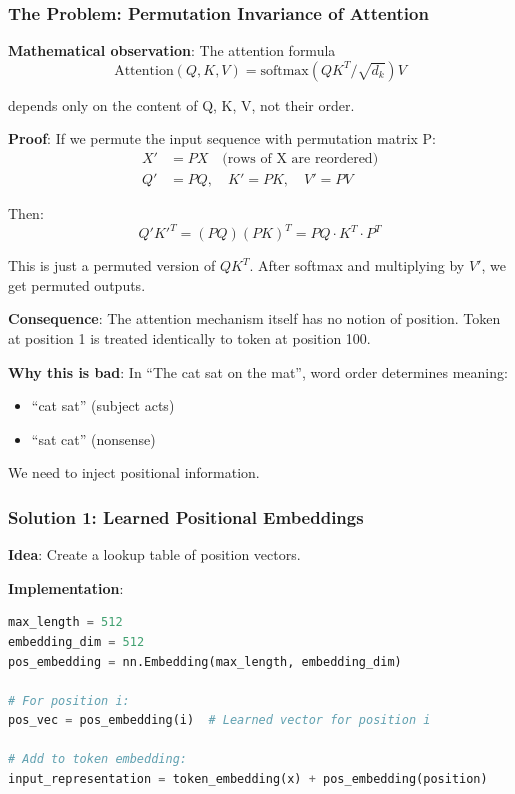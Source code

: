 \subsubsection{The Problem: Permutation Invariance of Attention}

\textbf{Mathematical observation}: The attention formula
\[
\text{Attention}(Q, K, V) = \text{softmax}(QK^T/\sqrt{d_k}) V
\]

depends only on the content of Q, K, V, not their order.

\textbf{Proof}: If we permute the input sequence with permutation matrix P:
\begin{align*}
X' &= PX  \quad \text{(rows of X are reordered)} \\
Q' &= PQ, \quad K' = PK, \quad V' = PV
\end{align*}

Then:
\[
Q'K'^T = (PQ)(PK)^T = PQ \cdot K^T \cdot P^T
\]

This is just a permuted version of $QK^T$. After softmax and multiplying by $V'$, we get permuted outputs.

\textbf{Consequence}: The attention mechanism itself has no notion of position. Token at position 1 is treated identically to token at position 100.

\textbf{Why this is bad}: In ``The cat sat on the mat'', word order determines meaning:
\begin{itemize}
\item ``cat sat'' (subject acts)
\item ``sat cat'' (nonsense)
\end{itemize}

We need to inject positional information.

\subsubsection{Solution 1: Learned Positional Embeddings}

\textbf{Idea}: Create a lookup table of position vectors.

\textbf{Implementation}:
\begin{lstlisting}[language=Python]
max_length = 512
embedding_dim = 512
pos_embedding = nn.Embedding(max_length, embedding_dim)

# For position i:
pos_vec = pos_embedding(i)  # Learned vector for position i

# Add to token embedding:
input_representation = token_embedding(x) + pos_embedding(position)
\end{lstlisting}

